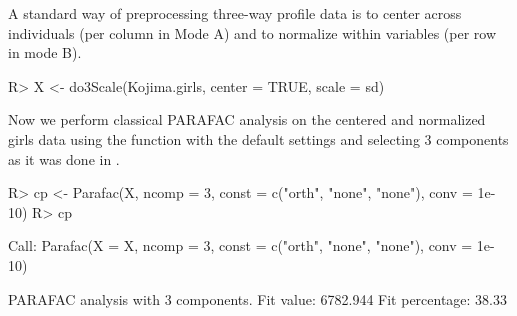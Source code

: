 \documentclass[article,shortnames, nojss]{jss}
\begin{document}
A standard way of preprocessing three-way profile data is to center
across individuals (per column in Mode A) and to normalize within variables
(per row in mode B).
\begin{Schunk}
\begin{Sinput}
R> X <- do3Scale(Kojima.girls, center = TRUE, scale = sd)
\end{Sinput}
\end{Schunk}
Now we perform classical PARAFAC analysis on the centered and normalized girls data
using the function  with the default settings and selecting 3 components
as it was done in \cite{kroonenberg:2009}.
\begin{Schunk}
\begin{Sinput}
R> cp <- Parafac(X, ncomp = 3, const = c("orth", "none", "none"), conv = 1e-10)
R> cp
\end{Sinput}
\begin{Soutput}
Call:
Parafac(X = X, ncomp = 3, const = c("orth", "none", "none"), 
    conv = 1e-10)


PARAFAC analysis with  3  components.
Fit value: 6782.944 
Fit percentage: 38.33 %
\end{Soutput}
\end{Schunk}
\end{document}
